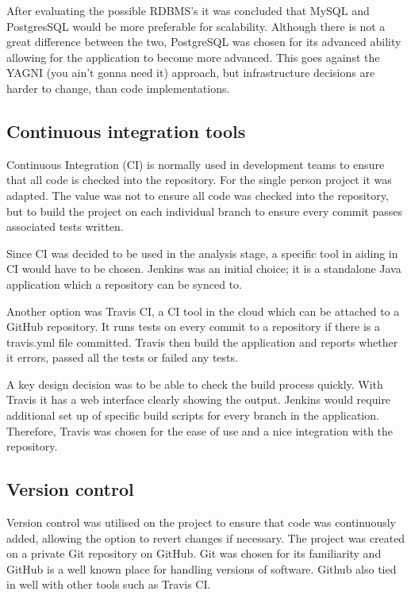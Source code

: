 \noindent
After evaluating the possible RDBMS's it was concluded that MySQL and PostgresSQL would be more preferable for scalability. Although there is not a great difference between the two, PostgreSQL was chosen for its advanced ability allowing for the application to become more advanced. This goes against the YAGNI (you ain't gonna need it) approach, but infrastructure decisions are harder to change, than code implementations.

\subsection{Continuous integration tools}
Continuous Integration (CI) is normally used in development teams to ensure that all code is checked into the repository. For the single person project it was adapted. The value was not to ensure all code was checked into the repository, but to build the project on each individual branch to ensure every commit passes associated tests written.

Since CI was decided to be used in the analysis stage, a specific tool in aiding in CI would have to be chosen. Jenkins was an initial choice; it is a standalone Java application which a repository can be synced to.

Another option was Travis CI, a CI tool in the cloud which can be attached to a GitHub repository. It runs tests on every commit to a repository if there is a travis.yml file committed. Travis then build the application and reports whether it errors, passed all the tests or failed any tests.

A key design decision was to be able to check the build process quickly. With Travis it has a web interface clearly showing the output. Jenkins would require additional set up of specific build scripts for every branch in the application. Therefore, Travis was chosen for the ease of use and a nice integration with the repository.

\subsection{Version control}
Version control was utilised on the project to ensure that code was continuously added, allowing the option to revert changes if necessary. The project was created on a private Git repository on GitHub. Git was chosen for its familiarity and GitHub is a well known place for handling versions of software. Github also tied in well with other tools such as Travis CI.




